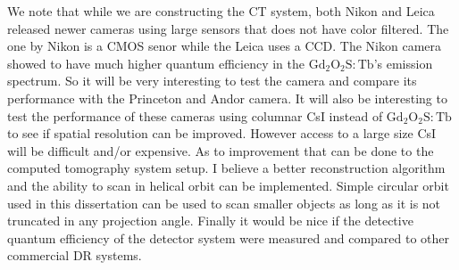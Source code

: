 We note that while we are constructing the CT system, both Nikon and Leica released newer cameras using large sensors that does not have color filtered.  The one by Nikon is a CMOS senor while the Leica uses a CCD.  The Nikon camera showed to have much higher quantum efficiency in the $\mathrm{Gd_2O_2S:Tb}$'s emission spectrum.  So it will be very interesting to test the camera and compare its performance with the Princeton and Andor camera.  It will also be interesting to test the performance of these cameras using columnar CsI instead of $\mathrm{Gd_2O_2S:Tb}$ to see if spatial resolution can be improved.  However access to a large size CsI will be difficult and/or expensive.  As to improvement that can be done to the computed tomography system setup.  I believe a better reconstruction algorithm and the ability to scan in helical orbit can be implemented.  Simple circular orbit used in this dissertation can be used to scan smaller objects as long as it is not truncated in any projection angle.  Finally it would be nice if the detective quantum efficiency of the detector system were measured and compared to other commercial DR systems.


